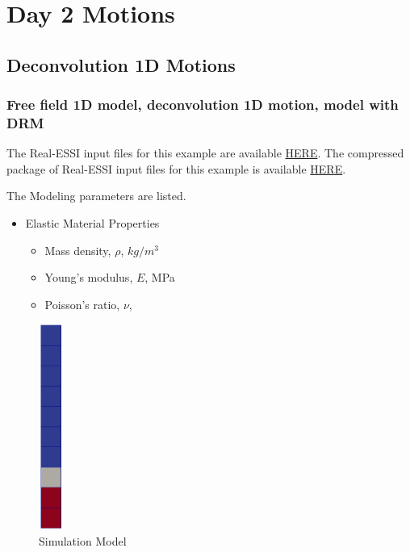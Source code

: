 \chapter{Day 2 Motions}
\label{ch-day2}




\clearpage
\newpage
\section{Deconvolution 1D Motions}
\label{Deconvolution_1D_Motions}


\subsection{Free field 1D model, deconvolution 1D motion, model with DRM}
\label{Free_fields_1D_model_with_DRM1}


The Real-ESSI input files for this example are available 
\href{https://github.com/yuan-energy/Real-ESSI-Short-Course-Examples/tree/master/short-course-examples/Day2/Deconvolution_1D_Motions/Free_fields_1D_model_with_DRM}{HERE}. 
The compressed package of Real-ESSI input files for this example is available 
\href{https://github.com/yuan-energy/Real-ESSI-Short-Course-Examples/blob/master/short-course-examples/Day2/Deconvolution_1D_Motions/Free_fields_1D_model_with_DRM/Free_fields_1D_model_with_DRM.tgz?raw=true}{HERE}. 

The Modeling parameters are listed.
\begin{itemize}
  \item Elastic Material Properties 
  \begin{itemize}
    \item Mass density, $\rho$, \enspace {} $kg/m^3$
    \item Young's modulus, $E$, \enspace {} MPa
    \item Poisson's ratio, $\nu$, \enspace {}
  \end{itemize}
\end{itemize}


\begin{figure}[H]
  \centering
  \includegraphics[width = 0.8cm]{./Figure-files/Day2/Deconvolution_1D_Motions/Free_fields_1D_model_with_DRM/overview.png}
  \caption{Simulation Model}
  \label{fig_decon_1D_motion_1D_model1}
\end{figure}

